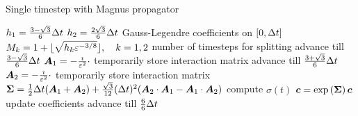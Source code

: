 \begin{algorithm}[ht]
	\caption{Single timestep with Magnus propagator}
	\label{alg:magnus}
	\begin{algorithmic}
	\State
		\State
		\State $h_1 = \frac{3-\sqrt{3}}{6} \Delta t$ $h_2 = \frac{2\sqrt{3}}{6} \Delta t$
		\Comment Gauss-Legendre coefficients on $[0,\Delta t]$
		\State $M_{k} = 1 + \lfloor \sqrt{h_{k} \varepsilon^{-3/8}} \rfloor, \quad k=1,2$
		\Comment number of timesteps for splitting
		\State
		\State {}
		\Comment advance till $\frac{3-\sqrt{3}}{6} \Delta t$
		\State $\bm{A}_1 = - \frac{\imath}{\varepsilon^2} \cdot$ 
		\Comment temporarily store interaction matrix
		\State {}
		\Comment advance till $\frac{3+\sqrt{3}}{6} \Delta t$
		\State $\bm{A}_2 = - \frac{\imath}{\varepsilon^2} \cdot$ 
		\Comment temporarily store interaction matrix
		\State $\bm{\Sigma} = \frac{1}{2} \Delta t (\bm{A}_1 + \bm{A}_2) + \frac{\sqrt{3}}{12} (\Delta t)^2 (\bm{A}_2 \cdot \bm{A}_1 - \bm{A}_1 \cdot \bm{A}_2)$
		\Comment compute $\sigma (t)$
		\State $\bm{c} = \exp \left( \bm{\Sigma} \right) \bm{c}$
		\Comment update coefficients
		\State {}
		\Comment advance till $\frac{6}{6} \Delta t$
		\State
	\EndProcedure
	\end{algorithmic}
\end{algorithm}

